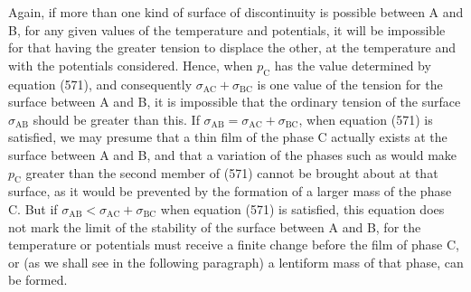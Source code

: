 \documentclass[12pt]{article}
\begin{document}
{Again, if more than one kind of surface of discontinuity is possible between A and B, for any given values of the temperature and potentials, it will be impossible for that having the greater tension to displace the other, at the temperature and with the potentials considered. Hence, when $p_{\text{C}}$ has the value determined by equation (571), and consequently $\sigma_{\text{AC}}+ \sigma_{\text{BC}}$ is one value of the tension for the surface between A and B, it is impossible that the ordinary tension of the surface $\sigma_{\text{AB}}$ should be greater than this.  If $\sigma_{\text{AB}}=\sigma_{\text{AC}}+ \sigma_{\text{BC}}$, when equation (571) is satisfied, we may presume that a thin film of the phase C actually exists at the surface between A and B, and that a variation of the phases such as would make $p_{\text{C}}$ greater than the second member of (571) cannot be brought about at that surface, as it would be prevented by the formation of a larger mass of the phase C. But if $\sigma_{\text{AB}}<\sigma_{\text{AC}}+ \sigma_{\text{BC}}$ when equation (571) is satisfied, this equation does not mark the limit of the stability of the surface between A and B, for the temperature or potentials must receive a finite change before the film of phase C, or (as we shall see in the following paragraph) a lentiform mass of that phase, can be formed.

}
\end{document}
